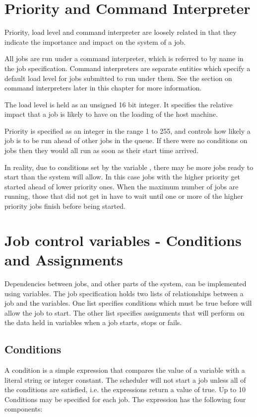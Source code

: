 \section{Priority and Command Interpreter}
Priority, load level and command interpreter are loosely related in that they indicate the importance and impact on the system of a job.

All jobs are run under a command interpreter, which is referred to by name in the job specification. Command interpreters are separate
entities which specify a default load level for jobs submitted to run under them. See the section on command interpreters later in this
chapter for more information.

The load level is held as an unsigned 16 bit integer. It specifies the relative impact that a job is likely to have on the loading of the host
machine.

Priority is specified as an integer in the range 1 to 255, and controls how likely a job is to be run ahead of other jobs in the queue. If
there were no conditions on jobs then they would all run as soon as their start time arrived.

In reality, due to conditions set by the variable , there may be more jobs ready to start
than the system will allow. In this case jobs with the higher priority get started ahead of lower priority ones. When the maximum number of
jobs are running, those that did not get in have to wait until one or more of the higher priority jobs finish before being started.

\section{Job control variables - Conditions and Assignments}
Dependencies between jobs, and other parts of the system, can be implemented using variables. The job specification holds two lists of
relationships between a job and the variables. One list specifies conditions which must be true before \ProductName{} will allow the job to
start. The other list specifies assignments that \ProductName{} will perform on the data held in variables when a job starts, stops or fails.

\subsection{Conditions}
A condition is a simple expression that compares the value of a variable with a literal string or integer constant. The scheduler will not start
a job unless all of the conditions are satisfied, i.e. the expressions return a value of true. Up to 10 Conditions may be specified for each
job. The expression has the following four components:

